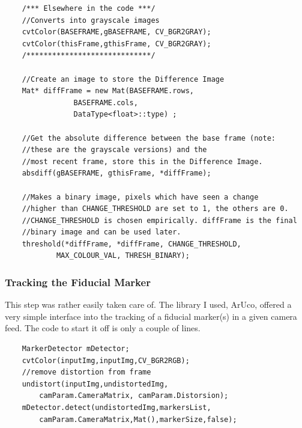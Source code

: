 \documentclass[11pt]{article}
\begin{document}
\begin{lstlisting}
	/*** Elsewhere in the code ***/
	//Converts into grayscale images
	cvtColor(BASEFRAME,gBASEFRAME, CV_BGR2GRAY);
	cvtColor(thisFrame,gthisFrame, CV_BGR2GRAY);
	/*****************************/

	//Create an image to store the Difference Image
  	Mat* diffFrame = new Mat(BASEFRAME.rows, 
  				BASEFRAME.cols,
  				DataType<float>::type) ;
	
	//Get the absolute difference between the base frame (note:
	//these are the grayscale versions) and the 
	//most recent frame, store this in the Difference Image.  				
  	absdiff(gBASEFRAME, gthisFrame, *diffFrame);	
  	
  	//Makes a binary image, pixels which have seen a change
  	//higher than CHANGE_THRESHOLD are set to 1, the others are 0.
  	//CHANGE_THRESHOLD is chosen empirically. diffFrame is the final
  	//binary image and can be used later.
  	threshold(*diffFrame, *diffFrame, CHANGE_THRESHOLD, 
  			MAX_COLOUR_VAL, THRESH_BINARY);
\end{lstlisting}

\subsubsection{Tracking the Fiducial Marker}
This step was rather easily taken care of. The library I used, ArUco, 
offered a very simple interface into the tracking of a fiducial marker(s)
in a given camera feed. The code to start it off is only a couple of 
lines.

\begin{lstlisting}
	MarkerDetector mDetector;
	cvtColor(inputImg,inputImg,CV_BGR2RGB);
	//remove distortion from frame
	undistort(inputImg,undistortedImg, 
		camParam.CameraMatrix, camParam.Distorsion);
	mDetector.detect(undistortedImg,markersList, 
		camParam.CameraMatrix,Mat(),markerSize,false);
\end{lstlisting}
\end{document}
